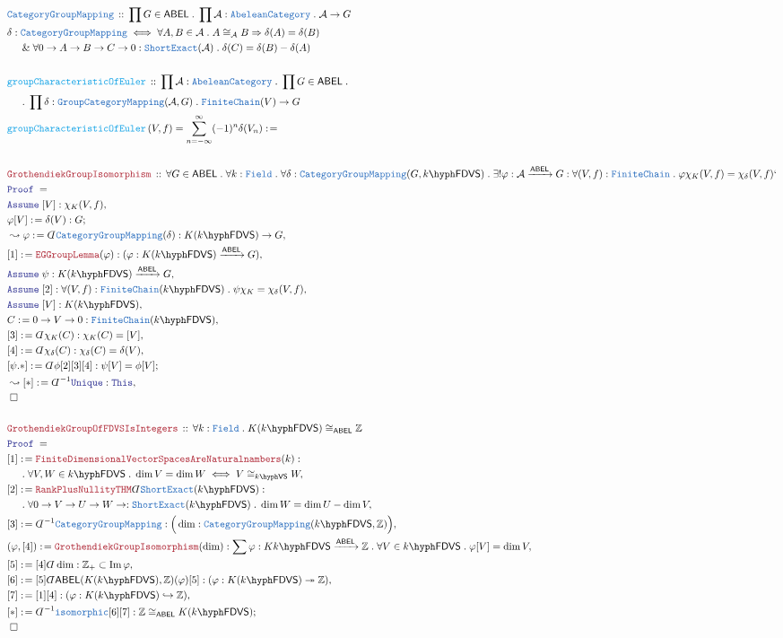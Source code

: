 \documentclass[12pt]{scrartcl}%
\newcommand{\TYPE}[1]{\textcolor{NavyBlue}{\mathtt{#1}}}%
\newcommand{\FUNC}[1]{\textcolor{Cerulean}{\mathtt{#1}}}%
\newcommand{\LOGIC}[1]{\textcolor{Blue}{\mathtt{#1}}}%
\newcommand{\THM}[1]{\textcolor{Maroon}{\mathtt{#1}}}%
\renewcommand{\.}{\; . \;} %
\newcommand{\de}{: \kern 0.1pc =} %
\newcommand{\Act}[1]{\left( #1 \right)} %
\newcommand{\Theorem}[2]{& \THM{#1} \, :: \, #2 \\ & \Proof = \\ } %
\newcommand{\DeclareType}[2]{& \TYPE{#1} \, :: \, #2 \\}%
\newcommand{\DefineType}[3]{& #1 : \TYPE{#2} \iff #3 \\}%
\newcommand{\DeclareFunc}[2]{& \FUNC{#1} \, :: \, #2 \\}%
\newcommand{\DefineNamedFunc}[4]{&  \FUNC{#1}\Act{#2} = #3 \de #4 \\}%
\newcommand{\NewLine}{\\ & \kern 1pc}%
\newcommand{\Page}[1]{ \begin{align*} #1 \end{align*}  }%
\newcommand{ \bd }{ \ByDef }%
\renewcommand{\And}{\; \& \;}%
\newcommand{\Int}{\mathbb{Z}}%
\DeclareMathOperator*{\im}{Im}%
\newcommand{\ToInj}{\hookrightarrow} %
\newcommand{\ToSurj}{\twoheadrightarrow} %
\newcommand{\Say}[3]{& #1 \de #2 : #3, \\} %
\newcommand{\Conclude}[3]{& #1 \de #2 : #3; \\}%
\newcommand{\Derive}[3]{& \leadsto #1 \de #2 : #3, \\} %
\newcommand{\Assume}[2]{& \LOGIC{Assume} \; #1 : #2, \\} %
\newcommand{\QED}{\; \square} %
\newcommand{\EndProof}{& \QED \\} %
\newcommand{\ByDef}{\rotatebox[origin=c]{-180}{$D$}}%
\newcommand{\Proof}{\LOGIC{Proof} \; } %
\newcommand{\Arrow}[1]{\xrightarrow{#1}}%
\newcommand{\A}{\mathcal{A}}
\newcommand{\ABEL}{\mathsf{ABEL}} %
\newcommand{\VS}[1]{#1\hyph\mathsf{VS}} %
\newcommand{\FDVS}[1]{#1\hyph\mathsf{FDVS}} %
\newcommand{\Field}{\TYPE{Field}}
\begin{document}
\Page{
	\DeclareType{CategoryGroupMapping}{\prod G \in \ABEL \. \prod \A : \TYPE{AbeleanCategory} \. \A \to G}
	\DefineType{\delta}{CategoryGroupMapping}{
		\forall A,B \in \A \. 
		A \cong_\A B \Rightarrow \delta(A) = \delta(B)  \NewLine
		\And \forall 0 \to A \to B \to C \to 0 : \TYPE{ShortExact}(\A) \. \delta(C) = \delta(B) - \delta(A) 
	}
	\\
	\DeclareFunc{groupCharacteristicOfEuler}{\prod \A : \TYPE{AbeleanCategory} \. \prod G \in \ABEL \. 
		\NewLine \. \prod \delta : \TYPE{GroupCategoryMapping}(\A,G) \. 
		\TYPE{FiniteChain}(V) \to G
	}
	\DefineNamedFunc{groupCharacteristicOfEuler}{V,f}{\sum^\infty_{n=-\infty} (-1)^n \delta(V_n)}
	\\
	\Theorem{GrothendiekGroupIsomorphism}{  
		\forall G \in \ABEL \.
		\forall k : \TYPE{Field} \. 
		\forall \delta : \TYPE{CategoryGroupMapping}(G,\FDVS{k}) \. 
		\exists ! \varphi : \A \Arrow{\ABEL} G : 
		\forall (V,f) : \TYPE{FiniteChain} \. 
		\varphi \chi_K(V,f) =  \chi_\delta(V,f)`
	}
	\Assume{[V]}{\chi_K(V,f)}
	\Conclude{\varphi[V]}{\delta(V)}{G}
	\Derive{\varphi}{\bd \TYPE{CategoryGroupMapping}(\delta)}{K(\FDVS{k}) \to G }
	\Say{[1]}{\THM{EGGroupLemma}(\varphi)}{(\varphi : K(\FDVS{k}) \Arrow{\ABEL} G )}
	\Assume{\psi}{K(\FDVS{k}) \Arrow{\ABEL} G}
	\Assume{[2]}{\forall (V,f) : \TYPE{FiniteChain}(\FDVS{k}) \. \psi \chi_K = \chi_\delta(V,f)}
	\Assume{[V]}{ K(\FDVS{k})}
	\Say{C}{0 \to V \to 0}{\TYPE{FiniteChain}(\FDVS{k})}
	\Say{[3]}{\bd \chi_K(C)}{ \chi_K(C) = [V]}
	\Say{[4]}{\bd \chi_\delta(C)}{\chi_\delta(C) = \delta(V)}
	\Conclude{[\psi.*]}{\bd \phi [2][3][4]}{\psi[V] = \phi[V]}
	\Derive{[*]}{\bd^{-1}\LOGIC{Unique}}{\LOGIC{This}}
	\EndProof
	\\
	\Theorem{GrothendiekGroupOfFDVSIsIntegers}{ \forall k : \Field \. K(\FDVS{k}) \cong_{\ABEL} \Int}
	\Say{[1]}{\THM{FiniteDimensionalVectorSpacesAreNaturalnambers}(k)}
	{ \NewLine \. \forall V,W \in \FDVS{k} \. \dim V = \dim W \iff V \cong_{\VS{k}} W }
	\Say{[2]}{\THM{RankPlusNullityTHM}\bd \TYPE{ShortExact}(\FDVS{k})}
	{
		\NewLine \. \forall 0 \to V \to U \to W \to : \TYPE{ShortExact}(\FDVS{k}) \. \dim W = \dim U - \dim V }
	\Say{[3]}{\bd^{-1}\TYPE{CategoryGroupMapping}}{\Big(\dim : \TYPE{CategoryGroupMapping}(\FDVS{k},\Int)\Big)}
	\Say{(\varphi,[4])}{\THM{GrothendiekGroupIsomorphism}(\dim)}{\sum \varphi : K{\FDVS{k}} \Arrow{\ABEL} \Int \. \forall V \in \FDVS{k} \. \varphi[V] = \dim V }
	\Say{[5]}{[4]\bd \dim}{\Int_+ \subset \im \varphi}
	\Say{[6]}{[5]\bd \ABEL(K(\FDVS{k}),\Int)(\varphi)[5]}{(\varphi : K(\FDVS{k}) \ToSurj \Int)}
	\Say{[7]}{[1][4]}{(\varphi : K(\FDVS{k}) \ToInj \Int)}
	\Conclude{[*]}{\bd^{-1} \TYPE{isomorphic}[6][7]}{\Int \cong_{\ABEL} K(\FDVS{k})}
	\EndProof
}
\newpage
\end{document}
